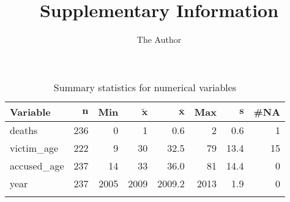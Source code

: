 \documentclass[11pt, oneside]{article}   	%
\title{Supplementary Information}
\author{The Author}
\begin{document}
\maketitle

{\footnotesize
\begin{longtable}{lrrrrrrr}
\caption{Summary statistics for numerical variables} \\
 \textbf{Variable} & $\mathbf{n}$ & \textbf{Min} & $\mathbf{\widetilde{x}}$ & $\mathbf{\bar{x}}$ & \textbf{Max} & $\mathbf{s}$ & \textbf{\#NA} \\ 
  \hline
deaths & 236 &    0 &    1 &    0.6 &    2 &  0.6 &  1 \\ 
  victim\_age & 222 &    9 &   30 &   32.5 &   79 & 13.4 & 15 \\ 
  accused\_age & 237 &   14 &   33 &   36.0 &   81 & 14.4 &  0 \\ 
  year & 237 & 2005 & 2009 & 2009.2 & 2013 &  1.9 &  0 \\ 
  \hline
\label{Summary statistics for numerical variables}
\end{longtable}
}
\end{document}
